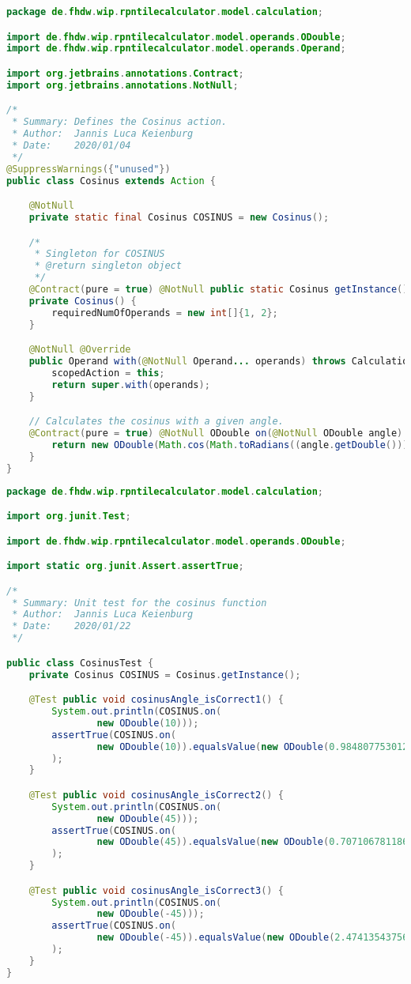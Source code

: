 \begin{lstlisting}[caption=Cosinus (Keienburg),label=list:Cosinus,language=Java]
package de.fhdw.wip.rpntilecalculator.model.calculation;

import de.fhdw.wip.rpntilecalculator.model.operands.ODouble;
import de.fhdw.wip.rpntilecalculator.model.operands.Operand;

import org.jetbrains.annotations.Contract;
import org.jetbrains.annotations.NotNull;

/*
 * Summary: Defines the Cosinus action.
 * Author:  Jannis Luca Keienburg
 * Date:    2020/01/04
 */
@SuppressWarnings({"unused"})
public class Cosinus extends Action {

    @NotNull
    private static final Cosinus COSINUS = new Cosinus();

    /*
     * Singleton for COSINUS
     * @return singleton object
     */
    @Contract(pure = true) @NotNull public static Cosinus getInstance() { return COSINUS; }
    private Cosinus() {
        requiredNumOfOperands = new int[]{1, 2};
    }

    @NotNull @Override
    public Operand with(@NotNull Operand... operands) throws CalculationException {
        scopedAction = this;
        return super.with(operands);
    }

    // Calculates the cosinus with a given angle.
    @Contract(pure = true) @NotNull ODouble on(@NotNull ODouble angle) {
        return new ODouble(Math.cos(Math.toRadians((angle.getDouble()))));
    }
}
\end{lstlisting}    

\begin{lstlisting}[caption=CosinusTest (Keienburg),label=list:CosinusTest,language=Java]
package de.fhdw.wip.rpntilecalculator.model.calculation;

import org.junit.Test;

import de.fhdw.wip.rpntilecalculator.model.operands.ODouble;

import static org.junit.Assert.assertTrue;

/*
 * Summary: Unit test for the cosinus function
 * Author:  Jannis Luca Keienburg
 * Date:    2020/01/22
 */

public class CosinusTest {
    private Cosinus COSINUS = Cosinus.getInstance();

    @Test public void cosinusAngle_isCorrect1() {
        System.out.println(COSINUS.on(
                new ODouble(10)));
        assertTrue(COSINUS.on(
                new ODouble(10)).equalsValue(new ODouble(0.984807753012208))
        );
    }

    @Test public void cosinusAngle_isCorrect2() {
        System.out.println(COSINUS.on(
                new ODouble(45)));
        assertTrue(COSINUS.on(
                new ODouble(45)).equalsValue(new ODouble(0.7071067811865476))
        );
    }

    @Test public void cosinusAngle_isCorrect3() {
        System.out.println(COSINUS.on(
                new ODouble(-45)));
        assertTrue(COSINUS.on(
                new ODouble(-45)).equalsValue(new ODouble(2.4741354375614093))
        );
    }
}
\end{lstlisting} 

